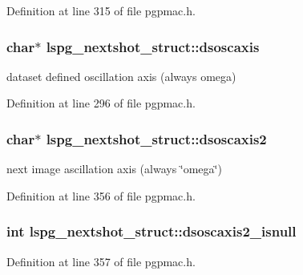 Definition at line 315 of file pgpmac.\-h.

\hypertarget{structlspg__nextshot__struct_a9a62c304e66013e8e5e5618a44f0b6d4}{
\subsubsection[{dsoscaxis}]{\setlength{\rightskip}{0pt plus 5cm}char$\ast$ lspg\-\_\-nextshot\-\_\-struct\-::dsoscaxis}}\label{structlspg__nextshot__struct_a9a62c304e66013e8e5e5618a44f0b6d4}


dataset defined oscillation axis (always omega) 



Definition at line 296 of file pgpmac.\-h.

\hypertarget{structlspg__nextshot__struct_ac86005a6e90ff502da9e95b59d0b7a5f}{
\subsubsection[{dsoscaxis2}]{\setlength{\rightskip}{0pt plus 5cm}char$\ast$ lspg\-\_\-nextshot\-\_\-struct\-::dsoscaxis2}}\label{structlspg__nextshot__struct_ac86005a6e90ff502da9e95b59d0b7a5f}


next image ascillation axis (always \char`\"{}omega\char`\"{}) 



Definition at line 356 of file pgpmac.\-h.

\hypertarget{structlspg__nextshot__struct_a98e280e99ae847559bb82836df3c32d1}{
\subsubsection[{dsoscaxis2\-\_\-isnull}]{\setlength{\rightskip}{0pt plus 5cm}int lspg\-\_\-nextshot\-\_\-struct\-::dsoscaxis2\-\_\-isnull}}\label{structlspg__nextshot__struct_a98e280e99ae847559bb82836df3c32d1}


Definition at line 357 of file pgpmac.\-h.

